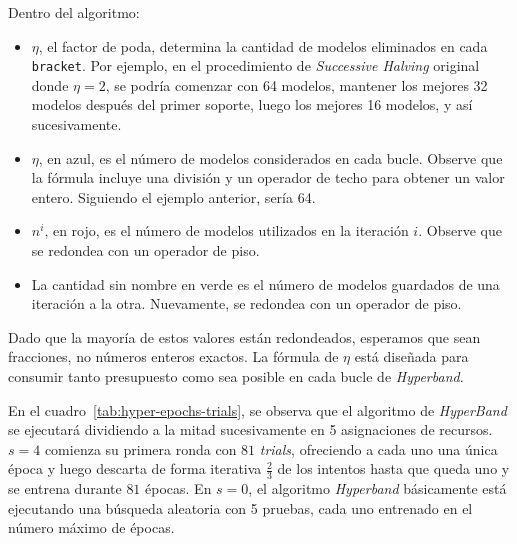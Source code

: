 \documentclass[a4paper,12pt]{article}
\begin{document}
Dentro del algoritmo:
\begin{itemize}[noitemsep, topsep=2pt]
	\item $\eta$, el factor de poda, determina la cantidad de modelos eliminados en cada \texttt{bracket}. Por ejemplo, en el procedimiento de \textit{Successive Halving} original donde $\eta = 2$, se podría comenzar con 64 modelos, mantener los mejores 32 modelos después del primer soporte, luego los mejores 16 modelos, y así sucesivamente.
	\item $\eta$, en azul, es el número de modelos considerados en cada bucle. Observe que la fórmula incluye una división y un operador de techo para obtener un valor entero. Siguiendo el ejemplo anterior, sería 64.
	\item $n^i$, en rojo, es el número de modelos utilizados en la iteración $i$. Observe que se redondea con un operador de piso.
	\item La cantidad sin nombre en verde es el número de modelos guardados de una iteración a la otra. Nuevamente, se redondea con un operador de piso.
\end{itemize}

Dado que la mayoría de estos valores están redondeados, esperamos que sean fracciones, no números enteros exactos. La fórmula de $\eta$ está diseñada para consumir tanto presupuesto como sea posible en cada bucle de \textit{Hyperband}.

\clearpage

En el cuadro~\ref{tab:hyper-epochs-trials}, se observa que el algoritmo de \textit{HyperBand} se ejecutará dividiendo a la mitad sucesivamente en 5 asignaciones de recursos. $s=4$ comienza su primera ronda con $81$ \textit{trials}, ofreciendo a cada uno una única época y luego descarta de forma iterativa $\frac{2}{3}$ de los intentos hasta que queda uno y se entrena durante $81$ épocas. En $s=0$, el algoritmo \textit{Hyperband} básicamente está ejecutando una búsqueda aleatoria con  5 pruebas, cada uno entrenado en el número máximo de épocas.

\setcounter{table}{2}
\end{document}
